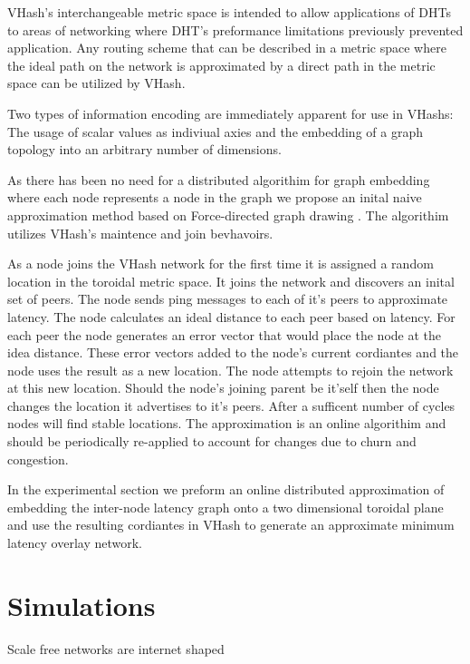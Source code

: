 \documentclass{IEEEtran}
\begin{document}
VHash's interchangeable metric space is intended to allow applications of DHTs to areas of networking where DHT's preformance limitations previously prevented application.
Any routing scheme that can be described in a metric space where the ideal path on the network is approximated by a direct path in the metric space can be utilized by VHash.


Two types of information encoding are immediately apparent for use in VHashs: The usage of scalar values as indiviual axies and the embedding of a graph topology into an arbitrary number of dimensions.

As there has been no need for a distributed algorithim for graph embedding where each node represents a node in the graph we propose an inital naive approximation method based on Force-directed graph drawing \cite{Spring}.
The algorithim utilizes VHash's maintence and join bevhavoirs.

As a node joins the VHash network for the first time it is assigned a random location in the toroidal metric space.
It joins the network and discovers an inital set of peers.
The node sends ping messages to each of it's peers to approximate latency.
The node calculates an ideal distance to each peer based on latency.
For each peer the node generates an error vector that would place the node at the idea distance.
These error vectors added to the node's current cordiantes and the node uses the result as a new location.
The node attempts to rejoin the network at this new location. Should the node's joining parent be it'self then the node changes the location it advertises to it's peers.
After a sufficent number of cycles nodes will find stable locations.
The approximation is an online algorithim and should be periodically re-applied to account for changes due to churn and congestion.





In the experimental section we preform an online distributed approximation of embedding the inter-node latency graph onto a two dimensional toroidal plane and use the resulting cordiantes in VHash to generate an approximate minimum latency overlay network. 


\section{Simulations}
Scale free networks are internet shaped\cite{cohen2000resilience}
\end{document}
